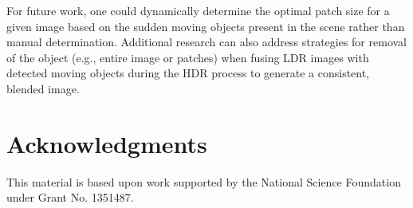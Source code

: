 \documentclass[preprint,12pt,3p]{elsarticle}
\begin{document}
For future work, one could dynamically determine the optimal patch size for a given image based on the sudden moving objects present in the scene rather than manual determination.  Additional research can also address strategies for removal of the object (e.g., entire image or patches) when fusing LDR images with detected moving objects during the HDR process to generate a consistent, blended image.

\section*{Acknowledgments}

This material is based upon work supported by the National Science Foundation under Grant No. 1351487.


% 
% 
% 
% 
% 
% 
% 
% 
% 
% 
% 
% 


\end{document}
